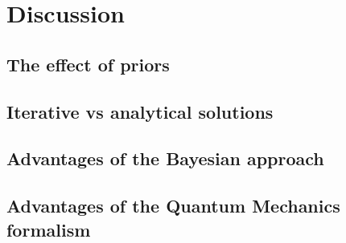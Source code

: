 \section{Discussion}
\subsection{The effect of priors}

\subsection{Iterative vs analytical solutions}

\subsection{Advantages of the Bayesian approach}

\subsection{Advantages of the Quantum Mechanics formalism}

